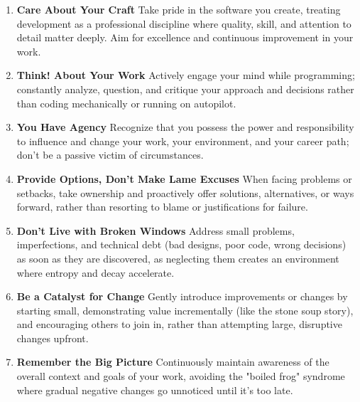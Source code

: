 \documentclass[11pt]{article}
\begin{document}
\begin{tcolorbox}[pragchapterbox={Chapter 1: A Pragmatic Philosophy}]
\begin{multicols}{2} %
\begin{enumerate}[label=\arabic*., itemsep=1ex, topsep=0pt, partopsep=0pt, labelwidth=!, labelindent=0pt, leftmargin=*] %
    \item \textbf{Care About Your Craft}
    Take pride in the software you create, treating development as a professional discipline where quality, skill, and attention to detail matter deeply. Aim for excellence and continuous improvement in your work.

    \item \textbf{Think! About Your Work}
    Actively engage your mind while programming; constantly analyze, question, and critique your approach and decisions rather than coding mechanically or running on autopilot.

    \item \textbf{You Have Agency}
    Recognize that you possess the power and responsibility to influence and change your work, your environment, and your career path; don't be a passive victim of circumstances.

    \item \textbf{Provide Options, Don’t Make Lame Excuses}
    When facing problems or setbacks, take ownership and proactively offer solutions, alternatives, or ways forward, rather than resorting to blame or justifications for failure.

    \item \textbf{Don’t Live with Broken Windows}
    Address small problems, imperfections, and technical debt (bad designs, poor code, wrong decisions) as soon as they are discovered, as neglecting them creates an environment where entropy and decay accelerate.

    \item \textbf{Be a Catalyst for Change}
    Gently introduce improvements or changes by starting small, demonstrating value incrementally (like the stone soup story), and encouraging others to join in, rather than attempting large, disruptive changes upfront.

    \item \textbf{Remember the Big Picture}
    Continuously maintain awareness of the overall context and goals of your work, avoiding the "boiled frog" syndrome where gradual negative changes go unnoticed until it's too late.


\end{enumerate}
\end{multicols}
\end{tcolorbox}
\end{document}
